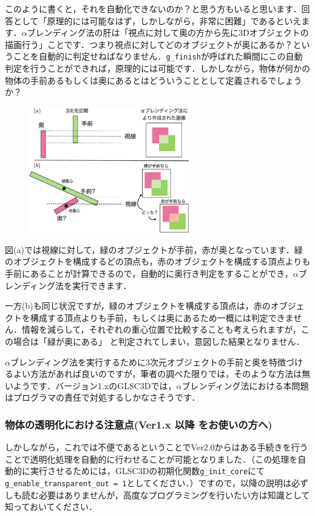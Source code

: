 \documentclass[platex,a4paper,12pt]{jsarticle}%
\begin{document}
このように書くと，それを自動化できないのか？と思う方もいると思います．回答として「原理的には可能なはず，しかしながら，非常に困難」であるといえます．$\alpha$ブレンディング法の肝は「視点に対して奥の方から先に3Dオブジェクトの描画行う」ことです．つまり視点に対してどのオブジェクトが奥にあるか？ということを自動的に判定せねばなりません．\verb|g_finish|が呼ばれた瞬間にこの自動判定を行うことができれば，原理的には可能です．しかしながら，物体が何かの物体の手前あるもしくは奥にあるとはどういうこととして定義されるでしょうか？

\begin{figure}
\vspace{-1\baselineskip}
	\includegraphics[width=70mm]{005.eps}
\end{figure}

図(a)では視線に対して，緑のオブジェクトが手前，赤が奥となっています．緑のオブジェクトを構成するどの頂点も，赤のオブジェクトを構成する頂点よりも手前にあることが計算できるので，自動的に奥行き判定をすることができ，$\alpha$ブレンディング法を実行できます．

一方(b)も同じ状況ですが，緑のオブジェクトを構成する頂点は，赤のオブジェクトを構成する頂点よりも手前，もしくは奥にあるため一概には判定できません．情報を減らして，それぞれの重心位置で比較することも考えられますが，この場合は「緑が奥にある」
と判定されてしまい，意図した結果となりません．

$\alpha$ブレンディング法を実行するために3次元オブジェクトの手前と奥を特徴づけるよい方法があれば良いのですが，筆者の調べた限りでは，そのような方法は無いようです．バージョン1.xのGLSC3Dでは，$\alpha$ブレンディング法における本問題はプログラマの責任で対処するしかなさそうです．

\subsubsection{物体の透明化における注意点(Ver1.x 以降 をお使いの方へ)}

しかしながら，これでは不便であるということでVer2.0からはある手続きを行うことで透明化処理を自動的に行わせることが可能となりました．（この処理を自動的に実行させるためには，GLSC3Dの初期化関数\verb|g_init_core|にて\verb|g_enable_transparent_out = 1|としてください．）ですので，以降の説明は必ずしも読む必要はありませんが，高度なプログラミングを行いたい方は知識として知っておいてください．
\end{document}
